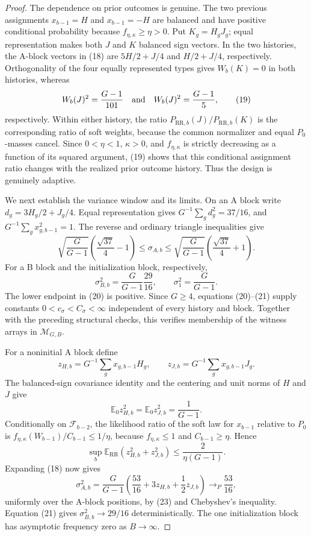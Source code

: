 \documentclass{article}
\begin{document}
\begin{proof}
The dependence on prior outcomes is genuine.  The two previous assignments \(x_{b-1}=H\) and \(x_{b-1}=-H\) are balanced and have positive conditional probability because \(f_{\eta,\kappa}\geq\eta>0\).  Put \(K_g=H_gJ_g\); equal representation makes both \(J\) and \(K\) balanced sign vectors.  In the two histories, the A-block vectors in (18) are \(5H/2+J/4\) and \(H/2+J/4\), respectively.  Orthogonality of the four equally represented types gives \(W_b(K)=0\) in both histories, whereas
\[
W_b(J)^2=\frac{G-1}{101}
\quad\hbox{and}\quad
W_b(J)^2=\frac{G-1}{5},                                   \tag{19}
\]
respectively.  Within either history, the ratio \(P_{\mathrm{RR},b}(J)/P_{\mathrm{RR},b}(K)\) is the corresponding ratio of soft weights, because the common normalizer and equal \(P_0\)-masses cancel.  Since \(0<\eta<1\), \(\kappa>0\), and \(f_{\eta,\kappa}\) is strictly decreasing as a function of its squared argument, (19) shows that this conditional assignment ratio changes with the realized prior outcome history.  Thus the design is genuinely adaptive.

We next establish the variance window and its limits.  On an A block write \(d_g=3H_g/2+J_g/4\).  Equal representation gives \(G^{-1}\sum_gd_g^2=37/16\), and \(G^{-1}\sum_gx_{g,b-1}^2=1\).  The reverse and ordinary triangle inequalities give
\[
\sqrt{\frac G{G-1}}\left(\frac{\sqrt{37}}4-1\right)
\leq\sigma_{A,b}
\leq\sqrt{\frac G{G-1}}\left(\frac{\sqrt{37}}4+1\right). \tag{20}
\]
For a B block and the initialization block, respectively,
\[
\sigma_{B,b}^2=\frac G{G-1}\frac{29}{16},
\qquad
\sigma_1^2=\frac G{G-1}.                                 \tag{21}
\]
The lower endpoint in (20) is positive.  Since \(G\geq4\), equations (20)--(21) supply constants \(0<c_\sigma<C_\sigma<\infty\) independent of every history and block.  Together with the preceding structural checks, this verifies membership of the witness arrays in \(\mathcal M_{G,B}\).

For a noninitial A block define
\[
z_{H,b}=G^{-1}\sum_gx_{g,b-1}H_g,
\qquad
z_{J,b}=G^{-1}\sum_gx_{g,b-1}J_g.
\]
The balanced-sign covariance identity and the centering and unit norms of \(H\) and \(J\) give
\[
\mathbb E_0z_{H,b}^2=\mathbb E_0z_{J,b}^2=\frac1{G-1}.    \tag{22}
\]
Conditionally on \(\mathcal F_{b-2}\), the likelihood ratio of the soft law for \(x_{b-1}\) relative to \(P_0\) is \(f_{\eta,\kappa}(W_{b-1})/C_{b-1}\leq1/\eta\), because \(f_{\eta,\kappa}\leq1\) and \(C_{b-1}\geq\eta\).  Hence
\[
\sup_b\mathbb E_{\mathrm{RR}}(z_{H,b}^2+z_{J,b}^2)
\leq\frac2{\eta(G-1)}.                                   \tag{23}
\]
Expanding (18) now gives
\[
\sigma_{A,b}^2
=\frac G{G-1}\left(\frac{53}{16}+3z_{H,b}+\frac12z_{J,b}\right)
\longrightarrow_P\frac{53}{16},                          \tag{24}
\]
uniformly over the A-block positions, by (23) and Chebyshev's inequality.  Equation (21) gives \(\sigma_{B,b}^2\to29/16\) deterministically.  The one initialization block has asymptotic frequency zero as \(B\to\infty\).


\end{proof}
\end{document}
